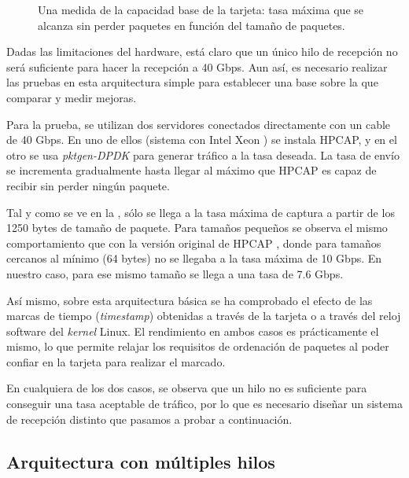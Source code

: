 \documentclass[oneside, draft]{epstfg}
\begin{document}
\begin{figure}[btp]
\caption[Capacidad de una arquitectura básica de captura]{Una medida de la capacidad base de la tarjeta: tasa máxima que se alcanza sin perder paquetes en función del tamaño de paquetes.}
\label{fig:Validacion:SimpleArchRate}
\end{figure}

Dadas las limitaciones del hardware, está claro que un único hilo de recepción no será suficiente para hacer la recepción a 40 Gbps. Aun así, es necesario realizar las pruebas en esta arquitectura simple para establecer una base sobre la que comparar y medir mejoras.

Para la prueba, se utilizan dos servidores conectados directamente con un cable de 40 Gbps. En uno de ellos (sistema con Intel Xeon ) se instala HPCAP, y en el otro se usa \textit{pktgen-DPDK} para generar tráfico a la tasa deseada. La tasa de envío se incrementa gradualmente hasta llegar al máximo que HPCAP es capaz de recibir sin perder ningún paquete.

Tal y como se ve en la , sólo se llega a la tasa máxima de captura a partir de los 1250 bytes de tamaño de paquete. Para tamaños pequeños se observa el mismo comportamiento que con la versión original de HPCAP \citep{MorenoTFM2012}, donde para tamaños cercanos al mínimo (64 bytes) no se llegaba a la tasa máxima de 10 Gbps. En nuestro caso, para ese mismo tamaño se llega a una tasa de 7.6 Gbps.

Así mismo, sobre esta arquitectura básica se ha comprobado el efecto de las marcas de tiempo (\textit{timestamp}) obtenidas a través de la tarjeta o a través del reloj software del \textit{kernel} Linux. El rendimiento en ambos casos es prácticamente el mismo, lo que permite relajar los requisitos de ordenación de paquetes al poder confiar en la tarjeta para realizar el marcado.

En cualquiera de los dos casos, se observa que un hilo no es suficiente para conseguir una tasa aceptable de tráfico, por lo que es necesario diseñar un sistema de recepción distinto que pasamos a probar a continuación.

\subsection{Arquitectura con múltiples hilos}
\end{document}
